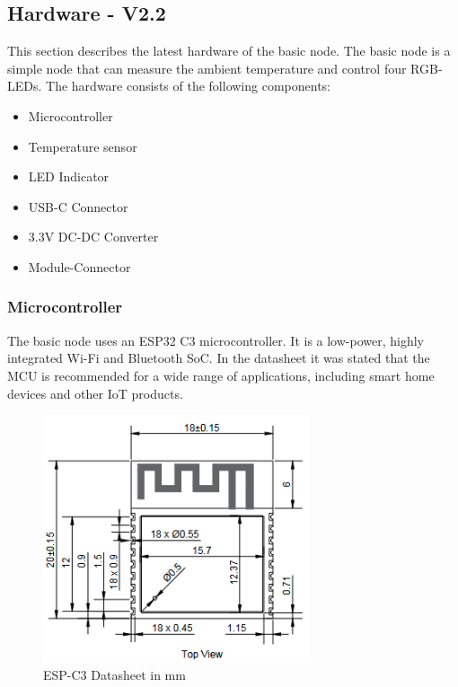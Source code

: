 
\subsection{Hardware - V2.2}

    This section describes the latest hardware of the basic node. The basic node is a 
    simple node that can measure the ambient temperature and control four RGB-LEDs.
    The hardware consists of the following components:

    \begin{itemize}
        \item Microcontroller
        \item Temperature sensor
        \item LED Indicator
        \item USB-C Connector
        \item 3.3V DC-DC Converter
        \item Module-Connector
    \end{itemize}

    \subsubsection{Microcontroller}
        The basic node uses an ESP32 C3 microcontroller. It is a low-power, highly
        integrated Wi-Fi and Bluetooth SoC. In the datasheet it was stated that the
        MCU is recommended for a wide range of applications, including smart home devices 
        and other IoT products.

        \begin{figure}[H]
            \centering
            \includegraphics[width=0.7\textwidth]{assets/HW/ESP32-C3-sheet.png}
            \caption{ESP-C3 Datasheet in mm}
        \end{figure}

